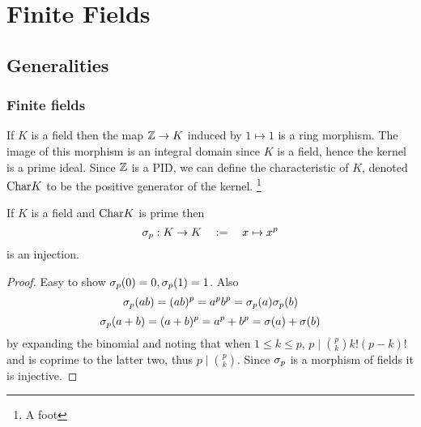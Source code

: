 \chapter{Finite Fields}
\section{Generalities}
\subsection{Finite fields}
\begin{dfn}
    If $K$ is a field then the map $\mathbb{Z} \to K$ induced by $1 \mapsto 1$
    is a ring morphism.
    The image of this morphism is an integral domain since $K$ is a field,
    hence the kernel is a prime ideal. 
    Since $\mathbb{Z}$ is a PID, 
    we can define the characteristic of $K$, denoted
    $\mathrm{Char}K$ to be the positive generator of the kernel.
    \footnote{A foot}
\end{dfn}

\begin{prop}
    If $K$ is a field and $\mathrm{Char}K$ is prime then 
    \[\sigma_p : K \to K \quad := \quad x \mapsto x^p\]
    is an injection.
\end{prop}
\begin{proof}
    Easy to show $\sigma_p(0) = 0, \sigma_p (1) = 1$. 
    Also
    \[\sigma_p (ab) = (ab)^p = a^p b^p = \sigma_p(a) \sigma_p(b)\]
    \[\sigma_p (a +b) = (a + b)^p = a^p + b^p = \sigma(a) + \sigma(b)\]
    by expanding the binomial and noting that when $1 \le k \le p$, 
    $ p \mid \binom{p}{k} k! (p-k)!$ and is coprime to the latter two,
    thus $p \mid \binom{p}{k}$.
    Since $\sigma_p$ is a morphism of fields it is injective.
\end{proof}

